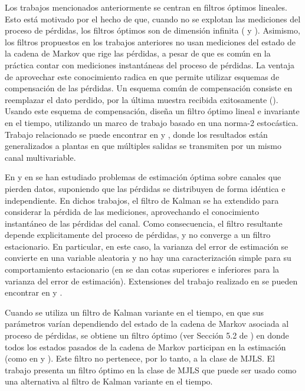 Los trabajos mencionados anteriormente se centran en filtros \'optimos lineales. Esto est\'a motivado por el hecho de que, cuando no se explotan las mediciones del proceso
de p\'erdidas, los filtros \'optimos son de dimensi\'on infinita (\cite{ackfu70} y \cite{baliki01}). Asimismo, los filtros propuestos en los trabajos anteriores no usan mediciones del estado de la cadena de Markov que rige las p\'erdidas, a pesar de que es com\'un en la pr\'actica contar con mediciones instant\'aneas del proceso de p\'erdidas. La ventaja de aprovechar este conocimiento radica en que permite utilizar esquemas de compensaci\'on de las p\'erdidas. Un esquema com\'un de compensaci\'on consiste en reemplazar el dato perdido, por la \'ultima muestra recibida exitosamente (\cite{schena09}). Usando este esquema de compensaci\'on, \cite{sachsh07} dise\~na un filtro \'optimo lineal e invariante en el tiempo, utilizando un marco de trabajo basado en una norma-2 estoc\'astica. Trabajo relacionado se puede encontrar en  \cite{suxixi08}
y \cite{lichpa10}, donde los resultados est\'an generalizados a plantas en que m\'ultiples salidas se transmiten por un mismo canal multivariable.

En \cite{scsifr07} y en \cite{siscfr04} se han estudiado problemas de estimaci\'on \'optima sobre canales que pierden datos, suponiendo que las p\'erdidas se distribuyen
de forma id\'entica e independiente. En dichos trabajos, el filtro de Kalman \cite{andmoo79} se ha extendido para considerar la p\'erdida de las mediciones, aprovechando el conocimiento instant\'aneo de las p\'erdidas del canal. Como consecuencia, el filtro resultante depende explicitamente del proceso de p\'erdidas, y no converge a un filtro estacionario. En particular, en este caso, la varianza del error de estimaci\'on se convierte en una variable aleatoria y no hay una caracterizaci\'on simple para su comportamiento estacionario (en \cite{siscfr04} se dan cotas superiores e inferiores para la varianza del error de estimaci\'on). Extensiones del trabajo realizado en \cite{siscfr04} se pueden encontrar en \cite{liugol04} y \cite{huadey07}.

Cuando se utiliza un filtro de Kalman variante en el tiempo, en que sus par\'ametros var\'ian dependiendo del estado de la cadena de Markov asociada al proceso de p\'erdidas, se obtiene un filtro \'optimo (ver Secci\'on 5.2 de \cite{cofrma05}) en donde todos los estados pasados de la cadena de Markov participan en la estimaci\'on (como en \cite{scsifr07} y \cite{siscfr04}). Este filtro no pertenece, por lo tanto, a la clase de MJLS. El trabajo \cite{cofrma05} presenta un filtro \'optimo en la clase de MJLS que puede ser usado como una alternativa al filtro de Kalman variante en el tiempo.

